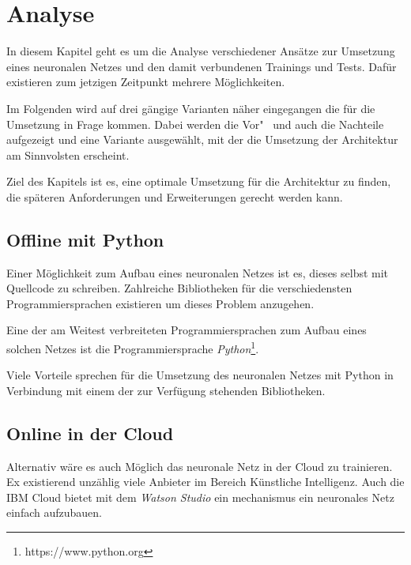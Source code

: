\section{Analyse}
\label{sec:analyse}
In diesem Kapitel geht es um die Analyse verschiedener Ansätze zur Umsetzung eines neuronalen Netzes und den damit
verbundenen Trainings und Tests. Dafür existieren zum jetzigen Zeitpunkt mehrere Möglichkeiten.

Im Folgenden wird auf drei gängige Varianten näher eingegangen die für die Umsetzung in Frage kommen. Dabei werden die
Vor"~ und auch die Nachteile aufgezeigt und eine Variante ausgewählt, mit der die Umsetzung der Architektur am
Sinnvolsten erscheint.

Ziel des Kapitels ist es, eine optimale Umsetzung für die Architektur zu finden, die späteren Anforderungen und
Erweiterungen gerecht werden kann.

\subsection{Offline mit Python}
Einer Möglichkeit zum Aufbau eines neuronalen Netzes ist es, dieses selbst mit Quellcode zu schreiben. Zahlreiche
Bibliotheken für die verschiedensten Programmiersprachen existieren um dieses Problem anzugehen.

Eine der am Weitest verbreiteten Programmiersprachen zum Aufbau eines solchen Netzes ist die Programmiersprache
\textit{Python}\footnote{https://www.python.org}.

Viele Vorteile sprechen für die Umsetzung des neuronalen Netzes mit Python in Verbindung mit einem der zur Verfügung
stehenden Bibliotheken.


\subsection{Online in der Cloud}
Alternativ wäre es auch Möglich das neuronale Netz in der Cloud zu trainieren. Ex existierend unzählig viele Anbieter im
Bereich Künstliche Intelligenz. Auch die IBM Cloud bietet mit dem \textit{Watson Studio} ein mechanismus ein neuronales
Netz einfach aufzubauen.


